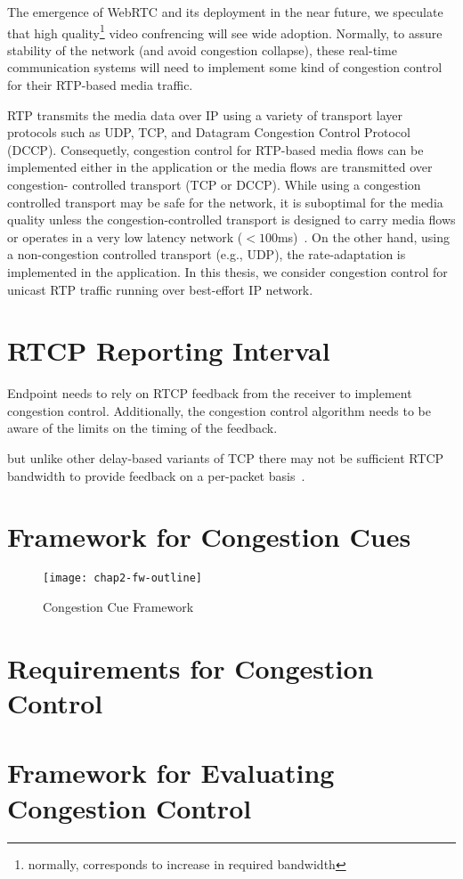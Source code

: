 The emergence of WebRTC and its deployment in the near future, we speculate
that high quality\footnote{normally, corresponds to increase in required
bandwidth} video confrencing will see wide adoption. Normally, to assure
stability of the network (and avoid congestion collapse), these real-time
communication systems will need to implement some kind of congestion control
for their RTP-based media traffic.

RTP transmits the media data over IP using a variety of transport layer
protocols such as UDP, TCP, and Datagram Congestion Control Protocol (DCCP).
Consequetly, congestion control for RTP-based media flows can be implemented
either in the application or the media flows are transmitted over congestion-%
controlled transport (TCP or DCCP). While using a congestion controlled
transport may be safe for the network, it is suboptimal for the media quality
unless the congestion-controlled transport is designed to carry media flows or
operates in a very low latency network ($<100$ms)~\cite{Brosh:tcp-real-time}.
On the other hand, using a non-congestion controlled transport (e.g., UDP),
the rate-adaptation is implemented in the application.  In this thesis, we
consider congestion control for unicast RTP traffic running over best-effort
IP network.


\section{RTCP Reporting Interval}

Endpoint needs to rely on RTCP feedback from the receiver to implement
congestion control.  Additionally, the congestion control algorithm needs to
be aware of the limits on the timing of the feedback. 


but unlike other delay-based variants of TCP there
may not be sufficient RTCP bandwidth to provide feedback on a per-packet
basis~\cite{draft.rmcat.feedback}.



\section{Framework for Congestion Cues}
\label{fw.fw}


\begin{figure}
\texttt{[image: chap2-fw-outline]}
\caption{Congestion Cue Framework}
\label{fig:4:fw}
\end{figure}


\section{Requirements for Congestion Control}
\label{fw.cc.req}

\section{Framework for Evaluating Congestion Control}
\label{fw.cc.eval}

